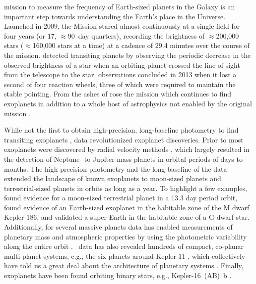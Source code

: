 
 mission to measure the frequency of Earth-sized planets in the Galaxy is an important step towards understanding the Earth's place in the Universe.  Launched in 2009, the \Kepler{} Mission \citep{Koch2010,Borucki2016} stared almost continuously at a single field for four years (or 17, $\approx$90~day quarters), recording the brightness of $\approx$200,000 stars ($\approx$160,000 stars at a time) at a cadence of 29.4 minutes over the course of the mission. \Kepler{} detected transiting planets by observing the periodic decrease in the observed brightness of a star when an orbiting planet crossed the line of sight from the telescope to the star.  observations concluded in 2013 when it lost a second of four reaction wheels, three of which were required to maintain the stable pointing.  From the ashes of \Kepler{} rose the \Ktwo{} mission which continues to find exoplanets in addition to a whole host of astrophysics not enabled by the original \Kepler{} mission \citep{Howell2014,VanCleve2016K2}.


While not the first to obtain high-precision, long-baseline photometry to find transiting exoplanets \citep[see e.g.,][]{Barge2008,ODonovan2006}, \Kepler{} data revolutionized exoplanet discoveries. Prior to \Kepler{,} most exoplanets were discovered by radial velocity methods \citep[e.g.][]{Mayor1995}, which largely resulted in the detection of Neptune- to Jupiter-mass planets in orbital periods of days to months. The high precision photometry and the long baseline of the \Kepler{} data extended the landscape of known exoplanets to moon-sized planets and terrestrial-sized planets in orbits as long as a year. To highlight a few examples, \citet{Barclay2013} found evidence for a moon-sized terrestrial planet in a 13.3 day period orbit, \citet{Quintana2014} found evidence of an Earth-sized exoplanet in the habitable zone of the M dwarf Kepler-186, and \citet{Jenkins2015} validated a super-Earth in the habitable zone of a G-dwarf star. Additionally, for several massive planets \Kepler{} data has enabled measurements of planetary mass and atmospheric properties by using the photometric variability along the entire orbit \citep{Shporer2011,Mazeh2012,Shporer2017}. \Kepler\ data has also revealed hundreds of compact, co-planar multi-planet systems, e.g., the six planets around Kepler-11 \citep{Lissauer2011}, which collectively have told us a great deal about the architecture of planetary systems \citep{Lissauer2011b,Fabrycky2014}.  Finally, exoplanets have been found orbiting binary stars, e.g., Kepler-16~(AB)~b \citep{Doyle2011}.


